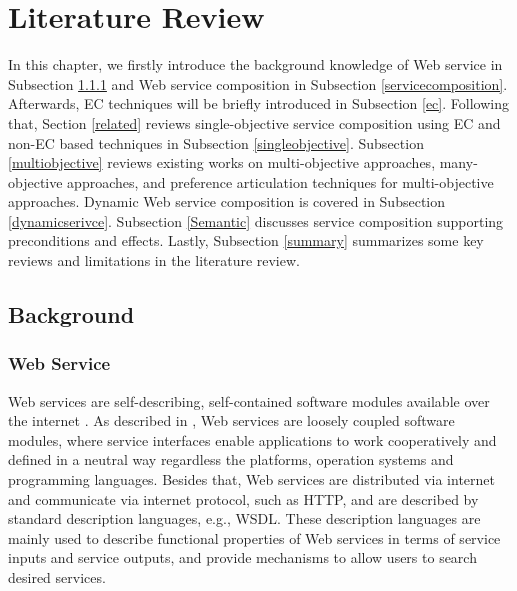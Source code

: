 \chapter{Literature Review}\label{C:review}
In this chapter, we firstly introduce the background knowledge of Web service in Subsection \ref{service} and Web service composition in Subsection \ref{servicecomposition}. Afterwards, EC techniques will be briefly introduced in Subsection \ref{ec}. Following that, Section \ref{related} reviews single-objective service composition using EC and non-EC based techniques in Subsection \ref{singleobjective}.  Subsection  \ref{multiobjective} reviews existing works on multi-objective approaches, many-objective approaches, and preference articulation techniques for multi-objective approaches. Dynamic Web service composition is covered in Subsection \ref{dynamicserivce}. Subsection \ref{Semantic}  discusses service composition supporting preconditions and effects. Lastly, Subsection \ref{summary} summarizes some key reviews and limitations in the literature review.
\section{Background}\label{background}
\subsection{Web Service}\label{service}

Web services are self-describing, self-contained software modules available over the internet \cite{erl2004service}. As described in \cite{erl2004service}, Web services are loosely coupled software modules, where service interfaces enable applications to work cooperatively and defined in a neutral way regardless the platforms, operation systems and programming languages. Besides that, Web services are distributed via internet and communicate via internet protocol, such as HTTP, and are described by standard description languages, e.g., WSDL. These description languages are mainly used to describe functional properties of Web services in terms of service inputs and service outputs, and provide mechanisms to allow users to search desired services. 

